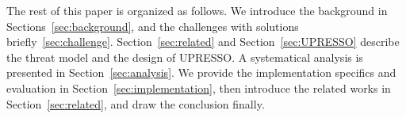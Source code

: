 The rest of this paper is organized as follows. We introduce the background in Sections~\ref{sec:background}, and the challenges with solutions briefly~\ref{sec:challenge}. Section~\ref{sec:related} and Section~\ref{sec:UPRESSO} describe the threat model and the design of UPRESSO. A systematical analysis is presented in Section~\ref{sec:analysis}. We provide the implementation specifics and evaluation in Section~\ref{sec:implementation}, then introduce the related works in Section~\ref{sec:related}, and draw the conclusion finally.




